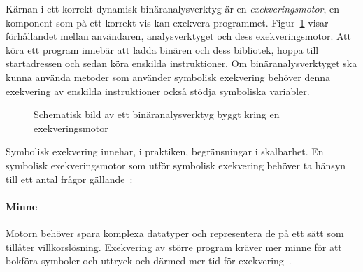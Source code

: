 
Kärnan i ett korrekt dynamisk binäranalysverktyg är en \emph{exekveringsmotor},
en komponent som på ett korrekt vis kan exekvera programmet.
Figur~\ref{schematic} visar förhållandet mellan användaren, analysverktyget och
dess exekveringsmotor. Att köra ett program innebär att ladda binären och dess
bibliotek, hoppa till startadressen och sedan köra enskilda instruktioner. Om
binäranalysverktyget ska kunna använda metoder som använder symbolisk
exekvering behöver denna exekvering av enskilda instruktioner också stödja
symboliska variabler.


\begin{figure}[H]
    \centering
    \caption{ Schematisk bild av ett binäranalysverktyg byggt kring en exekveringsmotor}\label{schematic}
\end{figure}

Symbolisk exekvering innehar, i praktiken, begränsningar i skalbarhet. En
symbolisk exekveringsmotor som utför symbolisk exekvering behöver ta hänsyn
till ett antal frågor gällande~\cite{survey_symb_exc}:

\paragraph{Minne} Motorn behöver spara komplexa datatyper och representera de
på ett sätt som tillåter villkorslösning. Exekvering av större program kräver
mer minne för att bokföra symboler och uttryck och därmed mer tid för
exekvering~\cite{survey_symb_exc}.

